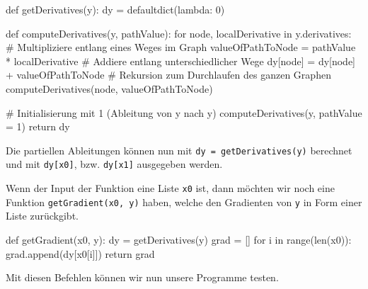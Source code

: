 \documentclass[
  a4paper,
  DIV=11]{scrreprt}
\newenvironment{Shaded}{\begin{snugshade}}{\end{snugshade}}
\newcommand{\BuiltInTok}[1]{\textcolor[rgb]{0.00,0.23,0.31}{#1}}
\newcommand{\CommentTok}[1]{\textcolor[rgb]{0.37,0.37,0.37}{#1}}
\newcommand{\ControlFlowTok}[1]{\textcolor[rgb]{0.00,0.23,0.31}{#1}}
\newcommand{\DecValTok}[1]{\textcolor[rgb]{0.68,0.00,0.00}{#1}}
\newcommand{\KeywordTok}[1]{\textcolor[rgb]{0.00,0.23,0.31}{#1}}
\newcommand{\NormalTok}[1]{\textcolor[rgb]{0.00,0.23,0.31}{#1}}
\newcommand{\OperatorTok}[1]{\textcolor[rgb]{0.37,0.37,0.37}{#1}}
\theoremstyle{definition}
\theoremstyle{definition}
\theoremstyle{remark}
\begin{document}
\begin{Shaded}
\begin{Highlighting}[]
\KeywordTok{def}\NormalTok{ getDerivatives(y):}
\NormalTok{    dy }\OperatorTok{=}\NormalTok{ defaultdict(}\KeywordTok{lambda}\NormalTok{: }\DecValTok{0}\NormalTok{)}

    \KeywordTok{def}\NormalTok{ computeDerivatives(y, pathValue):}
        \ControlFlowTok{for}\NormalTok{ node, localDerivative }\KeywordTok{in}\NormalTok{ y.derivatives:}
            \CommentTok{\# Multipliziere entlang eines Weges im Graph}
\NormalTok{            valueOfPathToNode }\OperatorTok{=}\NormalTok{ pathValue }\OperatorTok{*}\NormalTok{ localDerivative}
            \CommentTok{\# Addiere entlang unterschiedlicher Wege}
\NormalTok{            dy[node] }\OperatorTok{=}\NormalTok{ dy[node] }\OperatorTok{+}\NormalTok{ valueOfPathToNode}
            \CommentTok{\# Rekursion zum Durchlaufen des ganzen Graphen}
\NormalTok{            computeDerivatives(node, valueOfPathToNode)}

    \CommentTok{\# Initialisierung mit 1 (Ableitung von y nach y)}
\NormalTok{    computeDerivatives(y, pathValue }\OperatorTok{=} \DecValTok{1}\NormalTok{)}
    \ControlFlowTok{return}\NormalTok{ dy}
\end{Highlighting}
\end{Shaded}

Die partiellen Ableitungen können nun mit
\texttt{dy\ =\ getDerivatives(y)} berechnet und mit \texttt{dy{[}x0{]}},
bzw. \texttt{dy{[}x1{]}} ausgegeben werden.

Wenn der Input der Funktion eine Liste \texttt{x0} ist, dann möchten wir
noch eine Funktion \texttt{getGradient(x0,\ y)} haben, welche den
Gradienten von \texttt{y} in Form einer Liste zurückgibt.

\begin{Shaded}
\begin{Highlighting}[]
\KeywordTok{def}\NormalTok{ getGradient(x0, y):}
\NormalTok{    dy }\OperatorTok{=}\NormalTok{ getDerivatives(y)}
\NormalTok{    grad }\OperatorTok{=}\NormalTok{ []}
    \ControlFlowTok{for}\NormalTok{ i }\KeywordTok{in} \BuiltInTok{range}\NormalTok{(}\BuiltInTok{len}\NormalTok{(x0)):}
\NormalTok{        grad.append(dy[x0[i]])}
    \ControlFlowTok{return}\NormalTok{ grad}
\end{Highlighting}
\end{Shaded}

Mit diesen Befehlen können wir nun unsere Programme testen.
\end{document}
